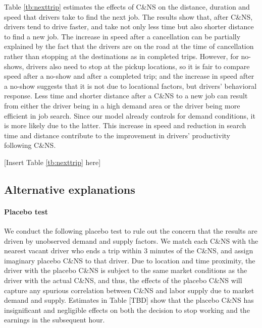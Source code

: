 \documentclass[reviewmode]{restat}
\begin{document}
Table \ref{tb:nexttrip} estimates the effects of C\&NS on the distance, duration and speed that drivers 
take to find the next job. The results show that, after C\&NS, drivers tend to drive faster, and take not
only less time but also shorter distance to find a new job. The increase in speed after a cancellation can
be partially explained by the fact that the drivers are on the road at the time of cancellation rather than 
stopping at the destinations as in completed trips. However, for no-shows, drivers also need to stop at the
pickup locations, so it is fair to compare speed after a no-show and after a completed trip; and the increase
in speed after a no-show suggests that it is not due to locational factors, but drivers' behavioral response.
Less time and shorter distance after a C\&NS to a new job can result from either the driver being in a high
demand area or the driver being more efficient in job search. Since our model already controls for demand 
conditions, it is more likely due to the latter. This increase in speed and reduction in search time and 
distance contribute to the improvement in drivers' productivity following C\&NS.

\begin{center}
	[Insert Table \ref{tb:nexttrip} here]
\end{center}

\subsection{Alternative explanations}

\paragraph{Placebo test}
We conduct the following placebo test to rule out the concern that the results are driven by unobserved demand and supply factors. We match each C\&NS with the nearest vacant driver who ends a trip within 3 minutes of the C\&NS, and assign imaginary placebo C\&NS to that driver. Due to location and time proximity, the driver with the placebo C\&NS is subject to the same market conditions as the driver with the actual C\&NS, and thus, the effects of the placebo C\&NS will capture any spurious correlation between C\&NS and labor supply due to market demand and supply. Estimates in Table [TBD] show that the placebo C\&NS has insignificant and negligible effects on both the decision to stop working and the earnings in the subsequent hour. 
\end{document}
